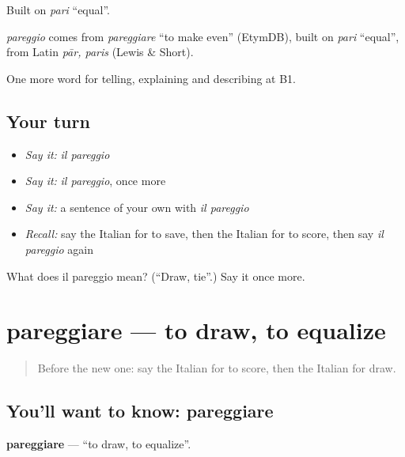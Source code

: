 Built on \emph{pari} \textquotedblleft{}equal\textquotedblright{}.

\begin{cousinweb}
\emph{pareggio} comes from \emph{pareggiare} \textquotedblleft{}to make even\textquotedblright{} (EtymDB), built on \emph{pari} \textquotedblleft{}equal\textquotedblright{}, from Latin \emph{pār, paris} (Lewis \& Short).
\end{cousinweb}

\begin{grammarlens}[title={What you've built}]
One more word for telling, explaining and describing at B1.
\end{grammarlens}

\subsection*{Your turn}
\begin{itemize}
\raggedright
  \item \emph{Say it:} \emph{il pareggio}
  \item \emph{Say it:} \emph{il pareggio}, once more
  \item \emph{Say it:} a sentence of your own with \emph{il pareggio}
  \item \emph{Recall:} say the Italian for to save, then the Italian for to score, then say \emph{il pareggio} again
\end{itemize}

\begin{tcolorbox}[breakable,colback=teal!4,colframe=teal!35!black,title={Before you move on}]
What does il pareggio mean? (\textquotedblleft{}Draw, tie\textquotedblright{}.) Say it once more.
\end{tcolorbox}
\section[pareggiare]{pareggiare — to draw, to equalize}

\label{lesson:IT-C511-pareggiare}



\begin{quote}
Before the new one: say the Italian for to score, then the Italian for draw.
\end{quote}

\subsection*{You'll want to know: pareggiare}
\textbf{pareggiare} — \textquotedblleft{}to draw, to equalize\textquotedblright{}.

